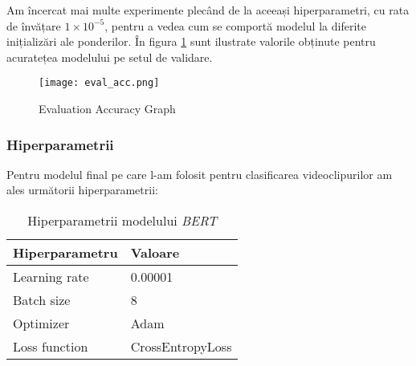 \par
Am încercat mai multe experimente plecând de la aceeași hiperparametri, cu rata de învățare $1 \times 10^{-5}$,
pentru a vedea cum se comportă modelul la diferite inițializări ale ponderilor. În figura \ref{fig:eval_acc}
sunt ilustrate valorile obținute pentru acuratețea modelului pe setul de validare.


\begin{figure}[h]
    \centering
    \texttt{[image: eval\_acc.png]}
    \caption{Evaluation Accuracy Graph}
    \label{fig:eval_acc}
\end{figure}

\subsubsection{Hiperparametrii}
Pentru modelul final pe care l-am folosit pentru clasificarea videoclipurilor am ales următorii hiperparametrii:


\begin{table}[ht]
    \centering
    \begin{tabular}{@{}ll@{}}
        \toprule
        \textbf{Hiperparametru}   & \textbf{Valoare}         \\
        \midrule
        Learning rate             & 0.00001                  \\
        Batch size             & 8                        \\
        Optimizer                      & Adam                     \\
        Loss function          & CrossEntropyLoss         \\
        \bottomrule
    \end{tabular}
    \caption{Hiperparametrii modelului \textit{BERT}}
    \label{tab:bert-hyperparameters}
\end{table}


